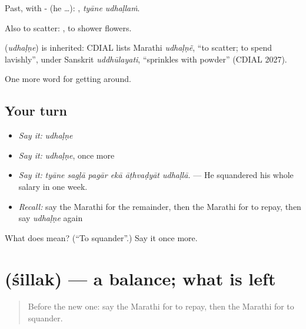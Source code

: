 Past, with - (he …):  , \emph{tyāne udhaḷlaṁ}.

Also to scatter:  , to shower flowers.

\begin{cousinweb}
\textbf{} (\emph{udhaḷṇe}) is inherited: CDIAL lists Marathi \emph{udhaḷṇẽ}, \textquotedblleft{}to scatter; to spend lavishly\textquotedblright{}, under Sanskrit \emph{uddhūlayati}, \textquotedblleft{}sprinkles with powder\textquotedblright{} (CDIAL 2027).
\end{cousinweb}

\begin{grammarlens}[title={What you've built}]
One more word for getting around.
\end{grammarlens}

\subsection*{Your turn}
\begin{itemize}
\raggedright
  \item \emph{Say it:} \emph{udhaḷṇe}
  \item \emph{Say it:} \emph{udhaḷṇe}, once more
  \item \emph{Say it:} \emph{tyāne sagḷā pagār ekā āṭhvaḍyāt udhaḷlā.} — He squandered his whole salary in one week.
  \item \emph{Recall:} say the Marathi for the remainder, then the Marathi for to repay, then say \emph{udhaḷṇe} again
\end{itemize}

\begin{tcolorbox}[breakable,colback=teal!4,colframe=teal!35!black,title={Before you move on}]
What does  mean? (\textquotedblleft{}To squander\textquotedblright{}.) Say it once more.
\end{tcolorbox}
\section[\texorpdfstring{\mr{शिल्लक} (śillak)}{शिल्लक (śillak)}]{ (śillak) — a balance; what is left}

\label{lesson:MR-C428-sillak}



\begin{quote}
Before the new one: say the Marathi for to repay, then the Marathi for to squander.
\end{quote}

